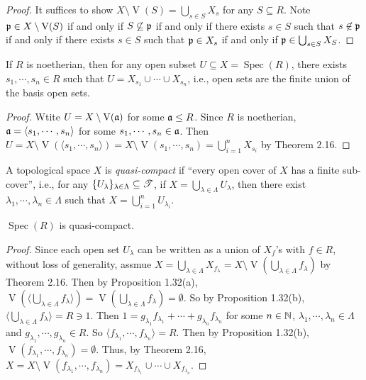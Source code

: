 \begin{proof}
    It suffices to show $X \setminus \operatorname{V}(S) = \bigcup_{s \in S}X_s$ for any $S \subseteq R$. Note $\mathfrak{p} \in X \setminus \operatorname{V}(S)$ if and only if $S \not \subseteq \mathfrak{p}$ if and only if there exists $s \in S$ such that $s \not \in \mathfrak{p}$ if and only if there exists $s \in S$ such that $\mathfrak{p} \in X_s$ if and only if $\mathfrak{p} \in \bigcup_{s \in S}X_S$.
\end{proof}

\begin{proposition}
    If $R$ is noetherian, then for any open subset $U \subseteq X = \operatorname{Spec}(R)$, there exists $s_1,\cdots,s_n \in R$ such that $U = X_{s_1} \cup \cdots \cup X_{s_n}$, i.e., open sets are the finite union of the basis open sets.
\end{proposition}

\begin{proof}
    Wtite $U = X \setminus \operatorname{V}(\mathfrak{a})$ for some $\mathfrak{a} \leq R$. Since $R$ is noetherian, $\mathfrak{a} = \langle s_1,\cdots,s_n \rangle$ for some $s_1,\cdots,s_n \in \mathfrak{a}$. Then $U = X \setminus \operatorname{V}(\langle s_1,\cdots,s_n \rangle) = X \setminus \operatorname{V}(s_1,\cdots,s_n) = \bigcup_{i=1}^n X_{s_i}$ by Theorem 2.16.
\end{proof}

\begin{definition}
    A topological space $X$ is \emph{quasi-compact} if ``every open cover of $X$ has a finite sub-cover'', i.e., for any $\{U_\lambda\}_{\lambda \in \Lambda} \subseteq \mathscr{T}$, if $X = \bigcup_{\lambda \in \Lambda} U_\lambda$, then there exist $\lambda_1,\cdots,\lambda_n \in \Lambda$ such that $X = \bigcup_{i=1}^n U_{\lambda_i}$.
\end{definition}

\begin{theorem}
    $\operatorname{Spec}(R)$ is quasi-compact.
\end{theorem}

\begin{proof}
    Since each open set $U_\lambda$ can be written as a union of $X_f$'s with $f \in R$, without loss of generality, assmue $X = \bigcup_{\lambda \in \Lambda} X_{f_\lambda} = X \setminus \operatorname{V}(\bigcup_{\lambda \in \Lambda}f_{\lambda})$ by Theorem 2.16. Then by Proposition 1.32(a), $\operatorname{V}(\langle \bigcup_{\lambda \in \Lambda}f_{\lambda} \rangle) = \operatorname{V}(\bigcup_{\lambda \in \Lambda}f_{\lambda}) = \emptyset$. So by Proposition 1.32(b), $\langle \bigcup_{\lambda \in \Lambda}f_{\lambda} \rangle = R \ni 1$. Then $1 = g_{\lambda_1} f_{\lambda_1} + \cdots + g_{\lambda_n}f_{\lambda_n}$ for some $n \in \mathbb{N}$, $\lambda_1,\cdots,\lambda_n \in \Lambda$ and $g_{\lambda_1},\cdots,g_{\lambda_n} \in R$. So $\langle f_{\lambda_1},\cdots,f_{\lambda_n} \rangle = R$. Then by Proposition 1.32(b), $\operatorname{V}(f_{\lambda_1},\cdots,f_{\lambda_n}) = \emptyset$. Thus, by Theorem 2.16, $X = X \setminus \operatorname{V}(f_{\lambda_1},\cdots,f_{\lambda_n}) = X_{f_{\lambda_1}} \cup \cdots \cup X_{f_{\lambda_n}}$.
\end{proof}

